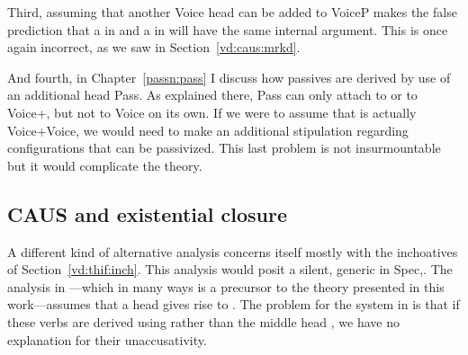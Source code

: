 \begin{exe}
\begin{xlist}
\begin{xlist}
\begin{exe}
\begin{exe}
\begin{xlist}
\begin{exe}
\begin{xlist}
\begin{exe}
\begin{xlist}
\begin{xlist}
\begin{exe}
\begin{xlist}
\begin{exe}
\begin{xlist}
\begin{exe}
\begin{exe}
\begin{exe}
\begin{xlist}
\begin{exe}
\begin{exe}
\begin{xlist}
\begin{xlist}
\begin{exe}
\begin{xlist}
\begin{exe}
\begin{exe}
\begin{exe}
\begin{xlist}
\begin{exe}
\begin{exe}
\begin{xlist}
\begin{exe}
\begin{xlist}
\begin{exe}
\begin{xlist}
\begin{exe}
\begin{xlist}
\begin{exe}
\begin{exe}
\begin{xlist}
\begin{exe}
\begin{exe}
\begin{xlist}
\begin{xlist}
\begin{exe}
\begin{xlist}
\begin{xlist}
\begin{exe}
\begin{xlist}
\begin{exe}
\begin{xlist}
\begin{exe}
\begin{xlist}
\begin{exe}
\begin{xlist}
\begin{exe}
\begin{exe}
\begin{exe}
\begin{exe}
\begin{xlist}
\begin{exe}
\begin{exe}
\begin{xlist}
\begin{xlist}
\begin{exe}
\begin{exe}
\begin{xlist}
\begin{exe}
\begin{xlist}
Third, assuming that another Voice head can be added to VoiceP makes the false prediction that a  in {\tkal} and a  in {\thif} will have the same internal argument. This is once again incorrect, as we saw in Section~\ref{vd:caus:mrkd}.

And fourth, in Chapter~\ref{passn:pass} I discuss how passives are derived by use of an additional head Pass. As explained there, Pass can only attach to {\vd} or to Voice+{\va}, but not to Voice on its own. If we were to assume that {\vd} is actually Voice+Voice, we would need to make an additional stipulation regarding configurations that can be passivized. This last problem is not insurmountable but it would complicate the theory.

	
	\subsection{CAUS and existential closure} \label{vd:others:ed}
A different kind of alternative analysis concerns itself mostly with the inchoatives of Section~\ref{vd:thif:inch}. This analysis would posit a silent, generic  in Spec,{\vd}. The analysis in \citet[61]{doron03}---which in many ways is a precursor to the theory presented in this work---assumes that a  head  gives rise to {\thif}. The problem for the system in \cite{doron03} is that if these verbs are derived using  rather than the middle head , we have no explanation for their unaccusativity.


\end{xlist}
\end{exe}
\end{xlist}
\end{exe}
\end{exe}
\end{xlist}
\end{xlist}
\end{exe}
\end{exe}
\end{xlist}
\end{exe}
\end{exe}
\end{exe}
\end{exe}
\end{xlist}
\end{exe}
\end{xlist}
\end{exe}
\end{xlist}
\end{exe}
\end{xlist}
\end{exe}
\end{xlist}
\end{xlist}
\end{exe}
\end{xlist}
\end{xlist}
\end{exe}
\end{exe}
\end{xlist}
\end{exe}
\end{exe}
\end{xlist}
\end{exe}
\end{xlist}
\end{exe}
\end{xlist}
\end{exe}
\end{xlist}
\end{exe}
\end{exe}
\end{xlist}
\end{exe}
\end{exe}
\end{exe}
\end{xlist}
\end{exe}
\end{xlist}
\end{xlist}
\end{exe}
\end{exe}
\end{xlist}
\end{exe}
\end{exe}
\end{exe}
\end{xlist}
\end{exe}
\end{xlist}
\end{exe}
\end{xlist}
\end{xlist}
\end{exe}
\end{xlist}
\end{exe}
\end{xlist}
\end{exe}
\end{exe}
\end{xlist}
\end{xlist}
\end{exe}

